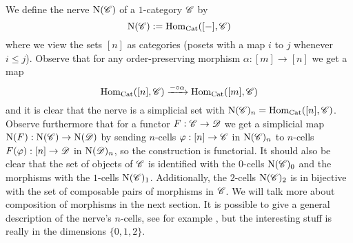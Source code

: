 \documentclass[../../thesis.tex]{subfiles}
\begin{document}
\begin{example}
\end{example}
\begin{example}\label{NerveDef}
    We define the nerve $\mathrm{N}(\mathscr{C})$ of a $1$-category $\mathscr{C}$ by
    \[
        \mathrm{N}(\mathscr{C}) : = \mathrm{Hom}_{\mathrm{Cat}}([{-}], \mathscr{C})
    \]
    where we view the sets $[n]$ as categories (posets with a map $i$ to $j$ whenever $i\leq j$).
    Observe that for any order-preserving morphism $\alpha : [m] \to [n]$ we get a map
    \[
        \mathrm{Hom}_{\mathrm{Cat}}([n], \mathscr{C}) \xrightarrow{{-} \circ \alpha} \mathrm{Hom}_{\mathrm{Cat}}([m], \mathscr{C})
    \]
    and it is clear that the nerve is a simplicial set with $\mathrm{N}(\mathscr{C})_n = \mathrm{Hom}_{\mathrm{Cat}}([n], \mathscr{C})$.
    \newline
    Observe furthermore that for a functor $F: \mathscr{C} \to \mathscr{D}$ we get a simplicial map $\mathrm{N}(F):\mathrm{N}(\mathscr{C}) \to \mathrm{N}(\mathscr{D})$ by sending $n$-cells $\varphi : [n] \to \mathscr{C}$ in $\mathrm{N}(\mathscr{C})_n$ to $n$-cells $F(\varphi) : [n] \to \mathscr{D}$ in $\mathrm{N}(\mathscr{D})_n$, so the construction is functorial.
    It should also be clear that the set of objects of $\mathscr{C}$ is identified with the $0$-cells $\mathrm{N}(\mathscr{C})_0$ and the morphisms with the $1$-cells $\mathrm{N}(\mathscr{C})_1$.
    Additionally, the $2$-cells $\mathrm{N}(\mathscr{C})_2$ is in bijective with the set of composable pairs of morphisms in $\mathscr{C}$.
    We will talk more about composition of morphisms in the next section.
    It is possible to give a general description of the nerve's $n$-cells, see for example \cite[Proposition 4.4.]{Rezk}, but the interesting stuff is really in the dimensions $\{0,1,2\}$.
\end{example}
\end{document}
